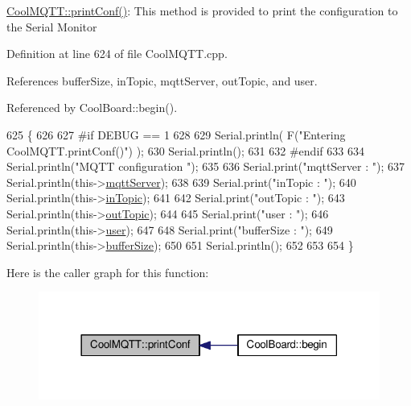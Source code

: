 \hyperlink{classCoolMQTT_a40553a0ad4b5ecf1cb4411ab54ca85fb}{Cool\+M\+Q\+T\+T\+::print\+Conf()}\+: This method is provided to print the configuration to the Serial Monitor 

Definition at line 624 of file Cool\+M\+Q\+T\+T.\+cpp.



References buffer\+Size, in\+Topic, mqtt\+Server, out\+Topic, and user.



Referenced by Cool\+Board\+::begin().


\begin{DoxyCode}
625 \{
626 
627 \textcolor{preprocessor}{#if DEBUG == 1 }
628 
629     Serial.println( F(\textcolor{stringliteral}{"Entering CoolMQTT.printConf()"}) );
630     Serial.println();   
631 
632 \textcolor{preprocessor}{#endif}
633     
634     Serial.println(\textcolor{stringliteral}{"MQTT configuration "});
635 
636     Serial.print(\textcolor{stringliteral}{"mqttServer : "});
637     Serial.println(this->\hyperlink{classCoolMQTT_ab8bb951f87ddbf92db74c2ad16a3e53e}{mqttServer});
638 
639     Serial.print(\textcolor{stringliteral}{"inTopic : "});
640     Serial.println(this->\hyperlink{classCoolMQTT_a4492f52a441e83cc5151010317fdb52d}{inTopic});
641 
642     Serial.print(\textcolor{stringliteral}{"outTopic : "});
643     Serial.println(this->\hyperlink{classCoolMQTT_a109c786a17b463f9eeba046194279522}{outTopic});
644 
645     Serial.print(\textcolor{stringliteral}{"user : "});
646     Serial.println(this->\hyperlink{classCoolMQTT_a8cd47e45d457f908d4b4390b35aaee83}{user});
647 
648     Serial.print(\textcolor{stringliteral}{"bufferSize : "});
649     Serial.println(this->\hyperlink{classCoolMQTT_a7f3cf26b51d6770f216e42c5ef13ca9f}{bufferSize});
650 
651     Serial.println();
652 
653 
654 \}
\end{DoxyCode}
Here is the caller graph for this function\+:\nopagebreak
\begin{figure}[H]
\begin{center}
\leavevmode
\includegraphics[width=318pt]{classCoolMQTT_a40553a0ad4b5ecf1cb4411ab54ca85fb_icgraph}
\end{center}
\end{figure}
\mbox{\label{classCoolMQTT_ace977b3e90ab14b1199fe5c4fb0a13ec}} 
